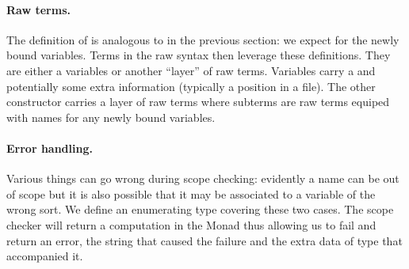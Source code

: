 \begin{center}
\begin{minipage}[t]{0.6\textwidth}
\end{minipage}
\begin{minipage}[t]{0.3\textwidth}
\end{minipage}
\end{center}

\paragraph{Raw terms.}
The definition of  is analogous to  in the
previous section: we expect  for the newly bound
variables. Terms in the raw syntax then leverage these
definitions. They are either a variables or another ``layer'' of raw
terms. Variables  carry a  and potentially some
extra information  (typically a position in a file). The other
constructor  carries a layer of raw terms where subterms are
raw terms equiped with names for any newly bound variables.

\begin{center}
\end{center}

\paragraph{Error handling.} Various things can go wrong during scope checking:
evidently a name can be out of scope but it is also possible that it may be
associated to a variable of the wrong sort. We define an enumerating type
covering these two cases. The scope checker will return a computation in the
Monad  thus allowing us to fail and return an error, the string that
caused the failure and the extra data of type  that accompanied it.

\begin{center}
\begin{minipage}[t]{0.5\textwidth}
\end{minipage}
\begin{minipage}[t]{0.4\textwidth}
\end{minipage}
\end{center}


